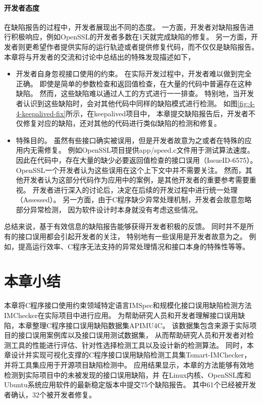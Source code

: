 \paragraph{开发者态度}
在缺陷报告的过程中，开发者展现出不同的态度。
一方面，开发者对缺陷报告进行积极响应，例如OpenSSL的开发者多数在1天就完成缺陷的修复。
另一方面，开发者则更希望作者提供实际的运行轨迹或者提供修复代码，而不仅仅是缺陷报告。
本章将与开发者的交流和讨论中总结出的特殊发现描述如下，
\begin{itemize}
	\item 开发者自身忽视接口使用的约束。
	在实际开发过程中，开发者难以做到完全正确。
	即使是简单的参数检查和返回值检查，在大量的代码中普遍存在这种缺陷。
	然而，这些缺陷难以通过人工的方式进行一一排查。
	特别地，当开发者认识到这些缺陷时，会对其他代码中同样的缺陷模式进行检测。
	如图\ref{fig:4-4-keepalived-fix}所示，在keepalived项目中，
	本章提交缺陷报告后，开发者不仅修复对应的缺陷，还对其他的代码进行类似缺陷的检测和修复。
	\item 特殊目的。
	虽然有些接口确实被误用，但是开发者故意为之或者在特殊的应用内无需修复。
	例如OpenSSL项目提供app/speed.c文件用于测试算法速度。
	因此在代码中，存在大量的缺少必要返回值检查的接口误用（IssueID-6575）。
	OpenSSL一个开发者认为这些误用在这个上下文中并不需要关注。
	然而，其他开发者认为这部分代码作为应用中的案例，是其他开发者的重要参考需要重视。
	开发者进行深入的讨论后，决定在后续的开发过程中进行统一处理（Assessed）。
	另一方面，由于C程序缺少异常处理机制，开发者会故意忽略部分异常检测，
	因为软件设计时本身就没有考虑这些情况。
\end{itemize}

总结来说，基于有效信息的缺陷报告能够获得开发者积极的反馈。
同时并不是所有的接口误用都会引起开发者的关注，
特别地有一些误用是开发者故意为之。
例如，提高运行效率、C程序无法支持的异常处理情况和接口本身的特殊性等等。


\section{本章小结}
\label{sec:4.5}
本章将C程序接口使用约束领域特定语言IMSpec和规模化接口误用缺陷检测方法IMChecker在实际项目中进行应用。
为帮助研究人员和开发者理解接口误用缺陷，本章整理C程序接口误用缺陷数据集APIMU4C。
该数据集包含来源于实际项目的接口误用案例库以及接口误用测试数据集，
从而帮助研究人员和开发者对检测工具的性能进行评估、针对性选择检测工具以及设计新的检测算法。
同时，本章设计并实现可视化支撑的C程序接口误用缺陷检测工具集Tsmart-IMChecker，
并将工具集应用于开源项目缺陷检测中。
应用结果显示，本章的方法能够有效地检测到实际项目中的未被发现的接口误用缺陷，并
在Linux内核、OpenSSL库和Ubuntu系统应用软件的最新稳定版本中提交75个缺陷报告。
其中61个已经被开发者确认，32个被开发者修复。